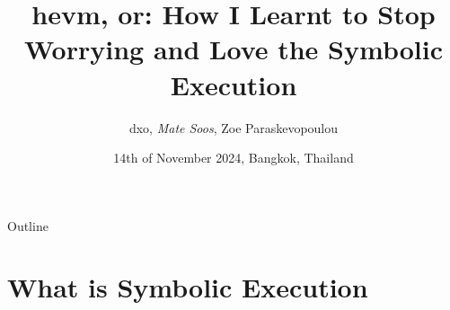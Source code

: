 \documentclass[aspectratio=169]{beamer}
\title[hevm]{hevm, or: How I Learnt to Stop Worrying and Love the Symbolic Execution}
\author[dxo, Soos, Paraskevopoulou]{dxo, \emph{Mate Soos}, Zoe Paraskevopoulou}
\institute[Argot]{\large Argot Collective}
\date{14th of November 2024, Bangkok, Thailand}
\begin{document}
\begin{frame}
    \titlepage 
\end{frame}

%

\begin{frame}{Outline}
    \tableofcontents
\end{frame}

\section{What is Symbolic Execution}


\end{document}
